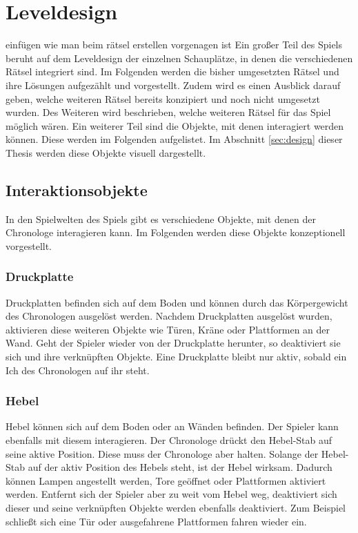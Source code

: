 \section{Leveldesign}
 einfügen wie man beim rätsel erstellen vorgenagen ist
Ein großer Teil des Spiels beruht auf dem Leveldesign der einzelnen Schauplätze, in denen die verschiedenen Rätsel integriert sind. Im Folgenden werden die bisher umgesetzten Rätsel und ihre Lösungen aufgezählt und vorgestellt. Zudem wird es einen Ausblick darauf geben, welche weiteren Rätsel bereits konzipiert und noch nicht umgesetzt wurden. Des Weiteren wird beschrieben, welche weiteren Rätsel für das Spiel möglich wären.
Ein weiterer Teil sind die Objekte, mit denen interagiert werden können. Diese werden im Folgenden aufgelistet. Im Abschnitt \ref{sec:design}  dieser Thesis werden diese Objekte visuell dargestellt.

\subsection{Interaktionsobjekte}
In den Spielwelten des Spiels gibt es verschiedene Objekte, mit denen der Chronologe interagieren kann. Im Folgenden werden diese Objekte konzeptionell vorgestellt.

\subsubsection{Druckplatte}
Druckplatten befinden sich auf dem Boden und können durch das Körpergewicht des Chronologen ausgelöst werden. Nachdem Druckplatten ausgelöst wurden, aktivieren diese weiteren Objekte wie  Türen, Kräne oder Plattformen an der Wand. Geht der Spieler wieder von der Druckplatte herunter, so deaktiviert sie sich und ihre verknüpften Objekte. Eine Druckplatte bleibt nur aktiv, sobald ein Ich des Chronologen auf ihr steht. 

\subsubsection{Hebel}
Hebel können sich auf dem Boden oder an Wänden befinden. Der Spieler kann ebenfalls mit diesem interagieren. Der Chronologe drückt den Hebel-Stab auf seine aktive Position. Diese muss der Chronologe aber halten. Solange der Hebel-Stab auf der aktiv Position des Hebels steht, ist der Hebel wirksam. Dadurch können Lampen angestellt werden, Tore geöffnet oder Plattformen aktiviert werden. Entfernt sich der Spieler aber zu weit vom Hebel weg, deaktiviert sich dieser und seine verknüpften Objekte werden ebenfalls deaktiviert. Zum Beispiel schließt sich eine Tür oder ausgefahrene Plattformen fahren wieder ein.

